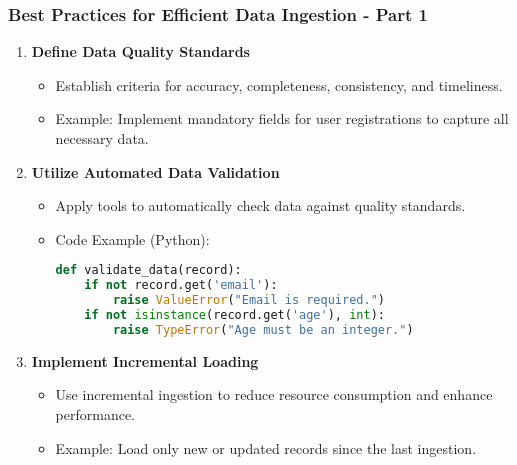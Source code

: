 \documentclass[aspectratio=169]{beamer}
\begin{document}
\begin{frame}[fragile]
    \frametitle{Best Practices for Efficient Data Ingestion - Part 1}
    \begin{enumerate}
        \item \textbf{Define Data Quality Standards}
        \begin{itemize}
            \item Establish criteria for accuracy, completeness, consistency, and timeliness.
            \item Example: Implement mandatory fields for user registrations to capture all necessary data.
        \end{itemize}

        \item \textbf{Utilize Automated Data Validation}
        \begin{itemize}
            \item Apply tools to automatically check data against quality standards.
            \item Code Example (Python):
            \begin{lstlisting}[language=Python]
def validate_data(record):
    if not record.get('email'):
        raise ValueError("Email is required.")
    if not isinstance(record.get('age'), int):
        raise TypeError("Age must be an integer.")
            \end{lstlisting}
        \end{itemize}

        \item \textbf{Implement Incremental Loading}
        \begin{itemize}
            \item Use incremental ingestion to reduce resource consumption and enhance performance.
            \item Example: Load only new or updated records since the last ingestion.
        \end{itemize}
    \end{enumerate}
\end{frame}
\end{document}
